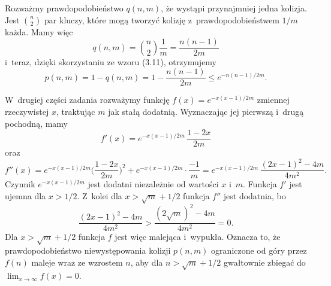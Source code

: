 
\exercise %

\noindent Rozważmy prawdopodobieństwo $q(n,m)$, że wystąpi przynajmniej jedna kolizja.
Jest $\binom{n}{2}$ par kluczy, które mogą tworzyć kolizję z~prawdopodobieństwem $1/m$ każda.
Mamy więc
\[
	q(n,m) = \binom{n}{2}\frac{1}{m} = \frac{n(n-1)}{2m}
\]
i~teraz, dzięki skorzystaniu ze wzoru (3.11), otrzymujemy
\[
	p(n,m) = 1-q(n,m) = 1-\frac{n(n-1)}{2m} \le e^{-n(n-1)/2m}.
\]

W~drugiej części zadania rozważymy funkcję $f(x)=e^{-x(x-1)/2m}$ zmiennej rzeczywistej $x$, traktując $m$ jak stałą dodatnią.
Wyznaczając jej pierwszą i~drugą pochodną, mamy
\[
	f'(x) = e^{-x(x-1)/2m}\,\frac{1-2x}{2m}
\]
oraz
\[
	f''(x) = e^{-x(x-1)/2m}\biggl(\frac{1-2x}{2m}\biggr)^2+e^{-x(x-1)/2m}\cdot\frac{-1}{m} = e^{-x(x-1)/2m}\,\frac{(2x-1)^2-4m}{4m^2}.
\]
Czynnik $e^{-x(x-1)/2m}$ jest dodatni niezależnie od wartości $x$ i~$m$.
Funkcja $f'$ jest ujemna dla $x>1/2$.
Z~kolei dla $x>\sqrt{m}+1/2$ funkcja $f''$ jest dodatnia, bo
\[
	\frac{(2x-1)^2-4m}{4m^2} > \frac{(2\sqrt{m})^2-4m}{4m^2} = 0.
\]
Dla $x>\sqrt{m}+1/2$ funkcja $f$ jest więc malejąca i~wypukła.
Oznacza to, że prawdopodobieństwo niewystępowania kolizji $p(n,m)$ ograniczone od góry przez $f(n)$ maleje wraz ze wzrostem $n$, aby dla $n>\sqrt{m}+1/2$ gwałtownie zbiegać do $\lim_{x\to\infty}f(x)=0$.
